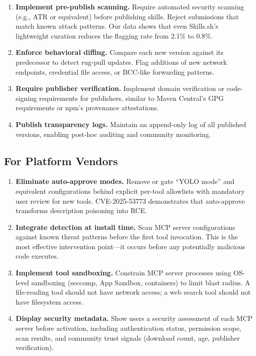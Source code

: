 \documentclass[11pt,twocolumn]{article}
\begin{document}
\begin{enumerate}[leftmargin=*]
    \item \textbf{Implement pre-publish scanning.} Require automated security scanning (e.g., ATR or equivalent) before publishing skills. Reject submissions that match known attack patterns. Our data shows that even Skills.sh's lightweight curation reduces the flagging rate from 2.1\% to 0.8\%.
    \item \textbf{Enforce behavioral diffing.} Compare each new version against its predecessor to detect rug-pull updates. Flag additions of new network endpoints, credential file access, or BCC-like forwarding patterns.
    \item \textbf{Require publisher verification.} Implement domain verification or code-signing requirements for publishers, similar to Maven Central's GPG requirements or npm's provenance attestations.
    \item \textbf{Publish transparency logs.} Maintain an append-only log of all published versions, enabling post-hoc auditing and community monitoring.
\end{enumerate}

\subsection{For Platform Vendors}

\begin{enumerate}[leftmargin=*]
    \item \textbf{Eliminate auto-approve modes.} Remove or gate ``YOLO mode'' and equivalent configurations behind explicit per-tool allowlists with mandatory user review for new tools. CVE-2025-53773 demonstrates that auto-approve transforms description poisoning into RCE.
    \item \textbf{Integrate detection at install time.} Scan MCP server configurations against known threat patterns before the first tool invocation. This is the most effective intervention point---it occurs before any potentially malicious code executes.
    \item \textbf{Implement tool sandboxing.} Constrain MCP server processes using OS-level sandboxing (seccomp, App Sandbox, containers) to limit blast radius. A file-reading tool should not have network access; a web search tool should not have filesystem access.
    \item \textbf{Display security metadata.} Show users a security assessment of each MCP server before activation, including authentication status, permission scope, scan results, and community trust signals (download count, age, publisher verification).
\end{enumerate}
\end{document}

